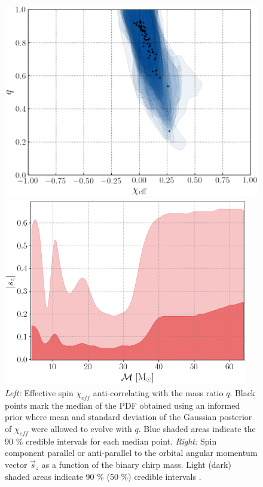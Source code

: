 \documentclass[a4paper,titlepage]{book}     	%
\begin{document}
\begin{figure}[h!]
	\begin{minipage}{.49\textwidth}
		\centering
		\includegraphics[width=\textwidth]{./images/spinmassratio.png}
	\end{minipage}
	\hfill
	\begin{minipage}{.49\textwidth}
		\centering
		\includegraphics[width=0.95\textwidth]{./images/spinchirpmass.png}	
	\end{minipage}
	\caption{\emph{Left:} Effective spin $\chi_{eff}$ anti-correlating with the mass ratio $q$. Black points mark the median of the PDF obtained using an informed prior where mean and standard deviation of the Gaussian posterior of $\chi_{eff}$ were allowed to evolve with $q$. Blue shaded areas indicate the 90 \% credible intervals for each median point. \emph{Right:} Spin component parallel or anti-parallel to the orbital angular momentum vector $\vec{s}_z$ as a function of the binary chirp mass. Light (dark) shaded areas indicate 90 \% (50 \%) credible intervals \cite{GWTC-3_interpretation}.}\label{fig:spincorrelations}
\end{figure}
\end{document}
